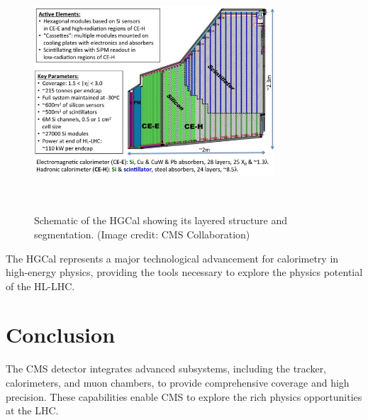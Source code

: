 \begin{figure}[h]
    \centering
    \includegraphics[width=0.8\textwidth]{Figures/HGCal.jpg}
    \caption{Schematic of the HGCal showing its layered structure and segmentation. (Image credit: CMS Collaboration)}~\cite{HGCal}
    \label{fig:hgcal}
\end{figure}

The HGCal represents a major technological advancement for calorimetry in high-energy physics, providing the tools necessary to explore the physics potential of the HL-LHC.


\section{Conclusion}
The CMS detector integrates advanced subsystems, including the tracker, calorimeters, and muon chambers, to provide comprehensive coverage and high precision. These capabilities enable CMS to explore the rich physics opportunities at the LHC.
